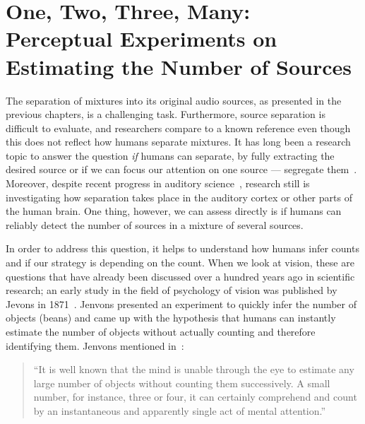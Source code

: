 \chapter[Perceptual Experiments on Estimating the Number of Sources]{One, Two, Three, Many: Perceptual Experiments on Estimating the Number of Sources}
\label{cha:countanalysis}
\bigskip
\bigskip
\bigskip
\bigskip
%
The separation of mixtures into its original audio sources, as presented in the previous chapters, is a challenging task.
Furthermore, source separation is difficult to evaluate, and researchers compare to a known reference even though this does not reflect how humans separate mixtures.
It has long been a research topic to answer the question \emph{if} humans can separate, by fully extracting the desired source or if we can focus our attention on one source --- segregate them~\cite{bregman90}.
Moreover, despite recent progress in auditory science~\cite{carlyon04, koelsch05, rabinowitz13}, research still is investigating how separation takes place in the auditory cortex or other parts of the human brain.
One thing, however, we can assess directly is if humans can reliably detect the number of sources in a mixture of several sources.
\par
In order to address this question, it helps to understand how humans infer counts and if our strategy is depending on the count.
When we look at vision, these are questions that have already been discussed over a hundred years ago in scientific research; an early study in the field of psychology of vision was published by Jevons in 1871~\cite{jevons1871}.
Jenvons presented an experiment to quickly infer the number of objects (beans) and came up with the hypothesis that humans can instantly estimate the number of objects without actually counting and therefore identifying them.
Jenvons mentioned in~\cite{jevons1871}:

\begin{quote}
``It is well known that the mind is unable through the eye to estimate any large number of objects without counting them successively. A small number, for instance, three or four, it can certainly comprehend and count by an instantaneous and apparently single act of mental attention.''
\end{quote}

